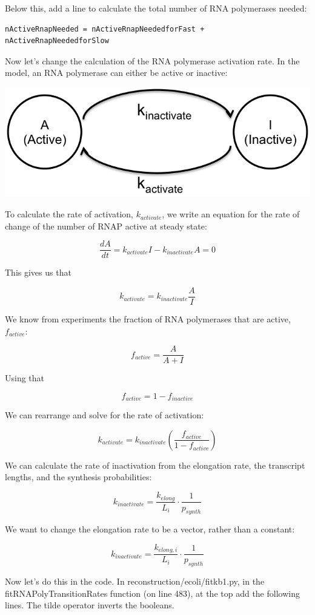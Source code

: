 \documentclass[12pt]{article}
\begin{document}
Below this, add a line to calculate the total number of RNA polymerases needed:

\begin{lstlisting}
nActiveRnapNeeded = nActiveRnapNeededforFast + nActiveRnapNeededforSlow
\end{lstlisting}

Now let’s change the calculation of the RNA polymerase activation rate. In the model, an RNA polymerase can either be active or inactive:

\includegraphics{img.png}


To calculate the rate of activation, $k_{activate}$, we write an equation for the rate of change of the number of RNAP active at steady state:

$$
\frac{dA}{dt}=k_{activate}I - k_{inactivate}A=0
$$

This gives us that

$$
k_{activate} = k_{inactivate}\frac{A}{I}
$$


We know from experiments the fraction of RNA polymerases that are active, $f_{active}$:

$$
f_{active}=\frac{A}{A+I}
$$

Using that 

$$
f_{active} = 1 - f_{inactive}
$$

We can rearrange and solve for the rate of activation:

$$
k_{activate}=k_{inactivate}\left(\frac{f_{active}}{1-f_{active}} \right)
$$

We can calculate the rate of inactivation from the elongation rate, the transcript lengths, and the synthesis probabilities:

$$
k_{inactivate}=\frac{k_{elong}}{L_i}\cdot\frac{1}{p_{synth}}
$$

We want to change the elongation rate to be a vector, rather than a constant:

$$
k_{inactivate}=\frac{k_{elong,i}}{L_i}\cdot \frac{1}{p_{synth}}
$$

Now let’s do this in the code. In reconstruction/ecoli/fitkb1.py, in the fitRNAPolyTransitionRates function (on line 483), at the top add the following lines. The tilde operator inverts the booleans.
\end{document}
